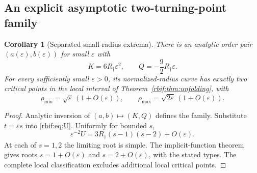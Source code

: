 \documentclass[11pt,a4paper]{article}
\newtheorem{corollary}[theorem]{Corollary}
\theoremstyle{definition}\newtheorem{definition}[theorem]{Definition}
\theoremstyle{remark}\newtheorem{remark}[theorem]{Remark}
\newcommand{\rbrr}{R_\dagger}
\numberwithin{equation}{section}
\begin{document}
\subsection{An explicit asymptotic two-turning-point family}
\begin{corollary}[Separated small-radius extrema]
\label{rbif:cor:twofamily}
There is an analytic order pair $(a(\varepsilon),b(\varepsilon))$ for
small $\varepsilon$ with
\begin{equation}
 K=6\rbrr\varepsilon^2,\qquad
 Q=-\frac92\rbrr\varepsilon.
 \label{rbif:eq:epsfamily}
\end{equation}
For every sufficiently small $\varepsilon>0$, its normalized-radius
curve has exactly two critical points in the local interval of
Theorem~\ref{rbif:thm:unfolding}, with
\begin{equation}
 \rho_{\min}=\sqrt\varepsilon\,(1+O(\varepsilon)),\qquad
 \rho_{\max}=\sqrt{2\varepsilon}\,(1+O(\varepsilon)).
 \label{rbif:eq:epsroots}
\end{equation}
\end{corollary}
\begin{proof}
Analytic inversion of $(a,b)\mapsto(K,Q)$ defines the family.
Substitute $t=\varepsilon s$ into \eqref{rbif:eq:U}. Uniformly for
bounded $s$,
\[
 \varepsilon^{-2}U
 =3\rbrr(s-1)(s-2)+O(\varepsilon).
\]
At each of $s=1,2$ the limiting root is simple. The implicit-function
theorem gives roots $s=1+O(\varepsilon)$ and
$s=2+O(\varepsilon)$, with the stated types. The complete local
classification excludes additional local critical points.
\end{proof}
\end{document}
